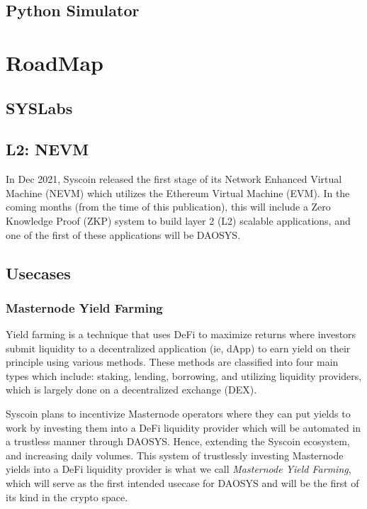 \documentclass[journal,twocolumn,12pt]{ieeesyscoin}
\begin{document}
\subsection{Python Simulator}

\lipsum[2-4]

\section{RoadMap}
\label{sec:roadmap}

\subsection{SYSLabs}

\lipsum[1]

\subsection{L2: NEVM}

In Dec 2021, Syscoin released the first stage of its Network Enhanced Virtual Machine (NEVM) which utilizes the Ethereum Virtual Machine (EVM). In the coming months (from the time of this publication), this will include a Zero Knowledge Proof (ZKP) system to build layer 2 (L2) scalable applications, and one of the first of these applications will be DAOSYS.

\subsection{Usecases}

\subsubsection{Masternode Yield Farming}

Yield farming is a technique that uses DeFi to maximize returns where investors submit liquidity to a decentralized application (ie, dApp) to earn yield on their principle using various methods. These methods are classified into four main types which include: staking, lending, borrowing, and utilizing liquidity providers, which is largely done on a decentralized exchange (DEX). 

Syscoin plans to incentivize Masternode operators where they can put yields to work by investing them into a DeFi liquidity provider which will be automated in a trustless manner through DAOSYS. Hence, extending the Syscoin ecosystem, and increasing daily volumes. This system of trustlessly investing Masternode yields into a DeFi liquidity provider is what we call \textit{Masternode Yield Farming}, which will serve as the first intended usecase for DAOSYS and will be the first of its kind in the crypto space.
\end{document}
